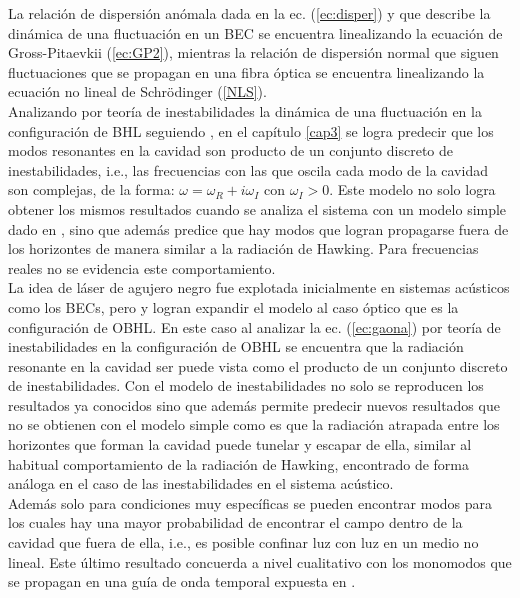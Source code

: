La relaci\'{o}n de dispersi\'{o}n an\'{o}mala dada en la ec. (\ref{ec:disper}) y que describe la din\'{a}mica de una fluctuaci\'{o}n en un BEC se encuentra linealizando la ecuaci\'{o}n de Gross-Pitaevkii (\ref{ec:GP2}), mientras la relaci\'{o}n de dispersi\'{o}n normal que siguen  fluctuaciones que se propagan  en una fibra \'{o}ptica se encuentra linealizando la ecuaci\'{o}n no lineal de Schr\"odinger (\ref{NLS}).\\


Analizando por teor\'{i}a de inestabilidades la din\'{a}mica de una fluctuaci\'{o}n en la configuraci\'{o}n de BHL seguiendo \cite{2018Bermudez}, en el cap\'{i}tulo \ref{cap3} se logra predecir que los modos resonantes en la cavidad son producto de un conjunto discreto de inestabilidades, i.e., las frecuencias con las que oscila cada modo de la cavidad son complejas, de la forma: $\omega=\omega_R+i\omega_I$ con $\omega_I>0$. Este modelo no solo logra obtener los mismos resultados cuando se analiza el sistema con un modelo simple dado en \cite{Leonhardt2007}, sino que adem\'{a}s predice que hay modos que logran propagarse fuera de los horizontes de manera similar a la radiaci\'{o}n de Hawking. Para frecuencias reales no se evidencia este comportamiento.\\

La idea de l\'{a}ser de agujero negro fue explotada inicialmente en sistemas ac\'{u}sticos como los BECs, pero \cite{Faccio2012} y \cite{GaonaReyes2017} logran expandir el modelo al caso \'{o}ptico que es la configuraci\'{o}n de OBHL. En este caso al analizar la ec. (\ref{ec:gaona}) por teor\'{i}a de inestabilidades en la configuraci\'{o}n de OBHL se encuentra que la radiaci\'{o}n resonante en la cavidad ser puede vista como el producto de un conjunto discreto de inestabilidades. Con el modelo de inestabilidades no solo se reproducen los resultados ya conocidos sino que adem\'{a}s  permite predecir nuevos resultados que no se obtienen con el modelo simple como es que la radiaci\'{o}n atrapada entre los horizontes que forman la cavidad puede tunelar y escapar de ella, similar al habitual comportamiento de la radiaci\'{o}n de Hawking, encontrado de forma an\'{a}loga en el caso de las inestabilidades en el sistema ac\'{u}stico.\\

Adem\'{a}s solo para condiciones muy espec\'{i}ficas se pueden encontrar modos para los cuales hay una mayor probabilidad de encontrar el campo dentro de la cavidad que fuera de ella, i.e., es posible confinar luz con luz en un medio no lineal. Este \'{u}ltimo  resultado concuerda a nivel cualitativo con los monomodos que se propagan en una gu\'{i}a de onda temporal expuesta en \cite{Plansinis2016}.\\

